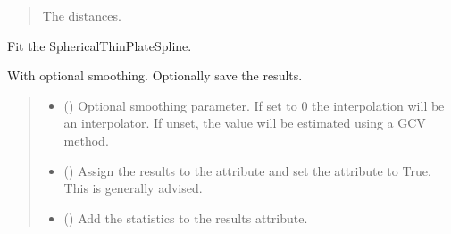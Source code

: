 \documentclass[letterpaper,10pt,english]{sphinxmanual}
\begin{document}
\begin{fulllineitems}
\begin{fulllineitems}
\begin{quote}
\begin{description}
\sphinxAtStartPar
{} \textendash{} The distances.

\sphinxAtStartPar
{}

\end{description}\end{quote}

\end{fulllineitems}


\begin{fulllineitems}
\label{\detokenize{splines:glomar_gridding.spline.SphericalThinPlateSpline.fit}}
\pysigstartsignatures
\pysiglinewithargsret
{}
{\sphinxparamcomma {}\sphinxparamcomma {}\sphinxparamcomma {}}
{}
\pysigstopsignatures
\sphinxAtStartPar
Fit the SphericalThinPlateSpline.

\sphinxAtStartPar
With optional smoothing. Optionally save the results.
\begin{quote}\begin{description}
\begin{itemize}
\item {}
\sphinxAtStartPar
{} () \textendash{} Optional smoothing parameter. If set to 0 the interpolation will be
an  interpolator. If unset, the value will be estimated
using a GCV method.

\item {}
\sphinxAtStartPar
{} () \textendash{} Assign the results to the  attribute and set the 
attribute to True. This is generally advised.

\item {}
\sphinxAtStartPar
{} () \textendash{} Add the statistics to the results attribute.


\end{itemize}
\end{description}
\end{quote}
\end{fulllineitems}
\end{fulllineitems}
\end{document}
